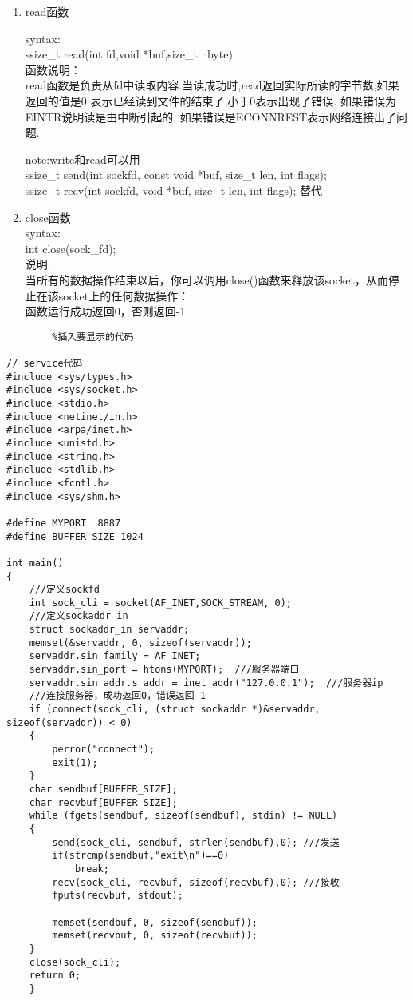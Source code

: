 \documentclass[utf8]{book}
\begin{document}
\begin{enumerate}
		
		\item read函数
		
		syntax:\\
		ssize\_t read(int fd,void *buf,size\_t nbyte)\\
		函数说明：\\
		read函数是负责从fd中读取内容.当读成功时,read返回实际所读的字节数,如果返回的值是0 表示已经读到文件的结束了,小于0表示出现了错误.
		如果错误为EINTR说明读是由中断引起的,
		如果错误是ECONNREST表示网络连接出了问题.
		
		note:write和read可以用\\
		
		ssize\_t send(int sockfd, const void *buf, size\_t len, int flags);\\
		ssize\_t recv(int sockfd, void *buf, size\_t len, int flags);
		替代\\
		
		\item close函数\\
		syntax:\\
		int close(sock\_fd);\\
		说明:\\
		当所有的数据操作结束以后，你可以调用close()函数来释放该socket，从而停止在该socket上的任何数据操作：\\
		函数运行成功返回0，否则返回-1	\\	

	\end{enumerate}
	
\lstset{language=C}
{\setmainfont{Courier New Bold}   
\begin{lstlisting}        %插入要显示的代码
		
// service代码		
#include <sys/types.h>
#include <sys/socket.h>
#include <stdio.h>
#include <netinet/in.h>
#include <arpa/inet.h>
#include <unistd.h>
#include <string.h>
#include <stdlib.h>
#include <fcntl.h>
#include <sys/shm.h>

#define MYPORT  8887
#define BUFFER_SIZE 1024

int main()
{
	///定义sockfd
	int sock_cli = socket(AF_INET,SOCK_STREAM, 0);
	///定义sockaddr_in
	struct sockaddr_in servaddr;
	memset(&servaddr, 0, sizeof(servaddr));
	servaddr.sin_family = AF_INET;
	servaddr.sin_port = htons(MYPORT);  ///服务器端口
	servaddr.sin_addr.s_addr = inet_addr("127.0.0.1");  ///服务器ip
	///连接服务器，成功返回0，错误返回-1
	if (connect(sock_cli, (struct sockaddr *)&servaddr, sizeof(servaddr)) < 0)
	{
		perror("connect");
		exit(1);
	}
	char sendbuf[BUFFER_SIZE];
	char recvbuf[BUFFER_SIZE];
	while (fgets(sendbuf, sizeof(sendbuf), stdin) != NULL)
	{
		send(sock_cli, sendbuf, strlen(sendbuf),0); ///发送
		if(strcmp(sendbuf,"exit\n")==0)
			break;
		recv(sock_cli, recvbuf, sizeof(recvbuf),0); ///接收
		fputs(recvbuf, stdout);

		memset(sendbuf, 0, sizeof(sendbuf));
		memset(recvbuf, 0, sizeof(recvbuf));
	}
	close(sock_cli);
	return 0;
	}
		
\end{lstlisting}}
\end{document}
